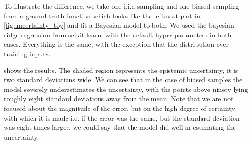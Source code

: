


To illustrate the difference, we take one i.i.d sampling and one biased sampling from a ground truth function which looks like the leftmost plot in \cref{fig:uncertainty_toy} and fit a Bayesian model to both. We used the bayesian ridge regression from scikit learn\citep{scikit-learn}, with the default hyper-parameters in both cases. Everything is the same, with the exception that the distribution over training inputs.

 shows the results. The shaded region represents the epistemic uncertainty, it is two standard deviations wide. We can see that in the case of biased samples the model severely underestimates the uncertainty, with the points above ninety lying roughly eight standard deviations away from the mean. Note that we are not focused about the magnitude of the error, but on the high degree of certainty with which it is made i.e. if the error was the same, but the standard deviation was eight times larger, we could say that the model did well in estimating the uncertainty. 


